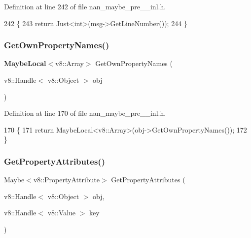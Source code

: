 Definition at line 242 of file nan\+\_\+maybe\+\_\+pre\+\_\+\_\+inl.\+h.


\begin{DoxyCode}
242                                                          \{
243   \textcolor{keywordflow}{return} Just<int>(msg->GetLineNumber());
244 \}
\end{DoxyCode}
\mbox{\label{nan__maybe__pre__43__inl_8h_aaa1efa68b7c513cd3801b9936eda72d6}} 
\subsubsection{Get\+Own\+Property\+Names()}
{\footnotesize\ttfamily \textbf{ Maybe\+Local}$<$v8\+::\+Array$>$ Get\+Own\+Property\+Names (\begin{DoxyParamCaption}\item[{v8\+::\+Handle$<$ v8\+::\+Object $>$}]{obj }\end{DoxyParamCaption})}



Definition at line 170 of file nan\+\_\+maybe\+\_\+pre\+\_\+\_\+inl.\+h.


\begin{DoxyCode}
170                                                                 \{
171   \textcolor{keywordflow}{return} MaybeLocal<v8::Array>(obj->GetOwnPropertyNames());
172 \}
\end{DoxyCode}
\mbox{\label{nan__maybe__pre__43__inl_8h_a4af4d4eed9212b3948508afaeff4dc90}} 
\subsubsection{Get\+Property\+Attributes()}
{\footnotesize\ttfamily Maybe$<$v8\+::\+Property\+Attribute$>$ Get\+Property\+Attributes (\begin{DoxyParamCaption}\item[{v8\+::\+Handle$<$ v8\+::\+Object $>$}]{obj,  }\item[{v8\+::\+Handle$<$ v8\+::\+Value $>$}]{key }\end{DoxyParamCaption})}




